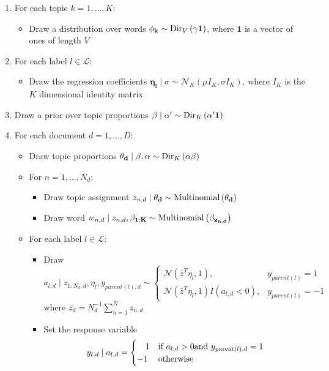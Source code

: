 \documentclass{article}
\begin{document}
\begin{enumerate}
\item For each topic $k=1,\ldots,K$: 

\begin{itemize}
\item Draw a distribution over words $\mathbf{\phi_{k}}\sim{\rm Dir}_{V}\left(\gamma\mathbf{1}\right)$,
where $\mathbf{1}$ is a vector of ones of length $V$ 
\end{itemize}
\item For each label $l\in\mathcal{L}$: 

\begin{itemize}
\item Draw the regression coefficients $\mathbf{\eta_{l}}\mid\sigma\sim\mathcal{N}_{K}\left(\mu I_{K},\sigma I_{K}\right)$,
where $I_{K}$ is the $K$ dimensional identity matrix 
\end{itemize}
\item Draw a prior over topic proportions $\mathbf{\beta}\mid\alpha'\sim{\rm Dir}_{K}\left(\alpha^{\prime}\mathbf{1}\right)$
\item For each document $d=1,\ldots,D$: 

\begin{itemize}
\item Draw topic proportions $\mathbf{\theta_{d}}\mid\beta,\alpha\sim{\rm Dir}_{K}\left(\alpha\mathbf{\beta}\right)$ 
\item For $n=1,\ldots,N_{d}$: 

\begin{itemize}
\item Draw topic assignment $z_{n,d}\mid\mathbf{\theta_{d}}\sim{\rm Multinomial}\left(\mathbf{\theta_{d}}\right)$ 
\item Draw word $w_{n,d}\mid z_{n,d},\mathbf{\beta_{1:K}}\sim{\rm Multinomial}\left(\mathbf{\beta_{z_{n,d}}}\right)$ 
\end{itemize}
\item For each label $l\in\mathcal{L}$: 

\begin{itemize}
\item Draw $a_{l,d}\mid z_{1:N_{d},d},\eta_{l},y_{parent(l),d}\sim\begin{cases}
\mathcal{N}\left(\bar{z}^{T}\eta_{l},1\right), & y_{parent(l)}=1\\
\mathcal{N}\left(\bar{z}^{T}\eta_{l},1\right)I\left(a_{l,d}<0\right), & y_{parent(l)}=-1\end{cases}$ where $\bar{z_{d}}=N_{d}^{-1}\sum_{n=1}^{N}z_{n,d}$ %
 
\item Set the response variable \[
y_{l,d}\mid a_{l,d}=\begin{cases}
\ \ \ 1 & \text{if \ensuremath{a_{l,d}>0}and \ensuremath{y_{{\rm parent}(l),d}=1}}\\
-1 & \text{otherwise}\end{cases}\]
 
\end{itemize}
\end{itemize}
\end{enumerate}
\end{document}
